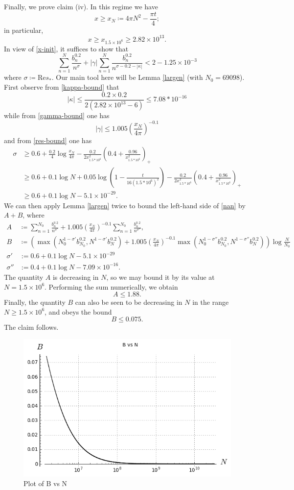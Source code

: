 Finally, we prove claim (iv).  In this regime we have
$$ x \geq x_N \coloneqq 4\pi N^2 - \frac{\pi t}{4};$$
in particular,
$$ x \geq x_{1.5 \times 10^6} \geq  2.82 \times 10^{13}.$$
In view of \eqref{x-init}, it suffices to show that
\begin{equation}\label{nan}
 \sum_{n=1}^N \frac{b_n^{0.2}}{n^\sigma} + |\gamma| \sum_{n=1}^N \frac{b_n^{0.2}}{n^{\sigma-0.2-|\kappa|}}
< 2 - 1.25 \times 10^{-3}
\end{equation}
where $\sigma \coloneqq \mathrm{Re} s_*$.
Our main tool here will be Lemma \ref{largen} (with $N_0 = 69098$).  First observe from \eqref{kappa-bound} that
$$ |\kappa| \leq \frac{0.2 \times 0.2}{2(2.82 \times 10^{13}-6)} \leq 7.08 * 10^{-16}$$
while from \eqref{gamma-bound} one has
$$
|\gamma| \leq 1.005 \left( \frac{x_N}{4\pi} \right)^{-0.1}$$
and from \eqref{res-bound} one has
\begin{align*}
\sigma &\geq 0.6 + \frac{0.2}{4} \log \frac{x_N}{4\pi} - \frac{0.2}{2x_{1.5*10^6}^2} \left(0.4+\frac{0.96}{x_{1.5*10^6}^2}\right)_+ \\
&\geq 0.6 + 0.1 \log N + 0.05 \log \left(1 - \frac{t}{16 (1.5*10^6)^2}\right) - \frac{0.2}{2x_{1.5*10^6}^2} \left(0.4+\frac{0.96}{x_{1.5*10^6}^2}\right)_+ \\
&\geq 0.6 + 0.1 \log N - 5.1 \times 10^{-29}.
\end{align*}
We can then apply Lemma \ref{largen} twice to bound the left-hand side of \eqref{nan} by $A+B$, where
\begin{align*}
A &\coloneqq \sum_{n=1}^{N_0} \frac{b_n^{0.2}}{n^{\sigma'}} + 1.005 \left( \frac{x_N}{4\pi} \right)^{-0.1} \sum_{n=1}^{N_0} \frac{b_n^{0.2}}{n^{\sigma''}}, \\
B &\coloneqq (\max( N_0^{1-\sigma'} b_{N_0}^{0.2}, N^{1-\sigma'} b_N^{0.2} ) + 1.005 \left( \frac{x_N}{4\pi} \right)^{-0.1} 
\max( N_0^{1-\sigma''} b_{N_0}^{0.2}, N^{1-\sigma''} b_N^{0.2} ) )\log \frac{N}{N_0} \\
\sigma' &:= 0.6 + 0.1 \log N - 5.1 \times 10^{-29} \\
\sigma'' &:= 0.4 + 0.1 \log N - 7.09 \times 10^{-16}.
\end{align*}
The quantity $A$ is decreasing in $N$, so we may bound it by its value at $N = 1.5 \times 10^6$.  Performing the sum numerically, we obtain
$$ A \leq 1.88.$$
Finally, the quantity $B$ can also be seen to be decreasing in $N$ in the range $N \geq 1.5 \times 10^6$, and obeys the bound
$$ B \leq 0.075.$$
The claim follows.

\begin{figure}[h!]
  \includegraphics[width=0.7\linewidth]{B_vs_N.png}
  \caption{Plot of B vs N}
\end{figure}

